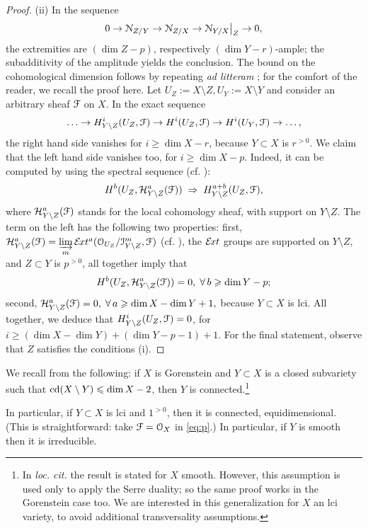\documentclass[11pt,reqno]{amsart}
\newenvironment{m-remark}{\vskip5pt\refstepcounter{stff}\trivlist \itemindent 0pt
\item[\hskip\labelsep\bf Remark~\thestff]\ignorespaces}{\endtrivlist\vskip5pt}
\let\euf\EuScript
\let\cal\mathcal
\let\nit\noindent
\numberwithin{equation}{section}
\numberwithin{figure}{section}
\let\sm\setminus
\let\ges\geqslant
\let\les\leqslant
\begin{document}
\begin{proof}
\nit(ii) In the sequence 
$$
0\to{{\euf N}}_{Z/Y}\to{{\euf N}}_{Z/X}\to{{{\euf N}}_{Y/X}\big|}_{Z}\to 0,
$$ 
the extremities are $(\dim Z-p)$, respectively $(\dim Y-r)$-ample; 
the subadditivity of the amplitude \cite[Theorem 3.1]{ar} yields the conclusion. 
The bound on the cohomological dimension follows by repeating \emph{ad litteram} 
\cite[Proposition 6.4]{ot}; for the comfort of the reader, we recall the proof here. 
Let $U_Z:=X\sm Z, U_Y:=X\sm Y$ and consider an arbitrary sheaf ${{\euf F}}$ on $X$. 
In the exact sequence 
$$
\ldots\to H^i_{Y\sm Z}(U_Z,{{\euf F}})\to H^i(U_Z,{{\euf F}})\to H^i(U_Y,{{\euf F}})\to\ldots,
$$
the right hand side vanishes for $i\ges\dim X-r$, because $Y\subset X$ is $r^{{>0}}$. 
We claim that the left hand side vanishes too, for $i\ges \dim X-p$. 
Indeed, it can be computed by using the spectral sequence 
(cf. \cite[Expos\'e I, Th\'eor\`eme 2.6]{groth}): 
$$
H^b(U_Z,\cal H^a_{Y\sm Z}({{\euf F}}))\;\Rightarrow\;H^{a+b}_{Y\sm Z}(U_Z,{{\euf F}}),
$$
where $\cal H^a_{Y\sm Z}({{\euf F}})$ stands for the local cohomology sheaf, with 
support on $Y\sm Z$. The term on the left has the following two properties: 
first, $\cal H^a_{Y\sm Z}({{\euf F}})=\underset{m}{\varinjlim}\,
{{\cal E}}{\kern-1pt}xt^a({{\euf O}}_{U_Z}/{{\euf I}}_{Y\sm Z}^m,{{\euf F}})$ 
(cf. \cite[Expos\'e II, Th\'eor\`eme 2]{groth}), the ${{\cal E}}{\kern-1pt}xt$ groups 
are supported on $Y\sm Z$, and $Z\subset Y$ is $p^{{>0}}$, all together imply that 
$$
H^b(U_Z,\cal H^a_{Y\sm Z}({{\euf F}}))=0,\;\forall\,b\ges\dim Y-p;
$$
second, $\cal H^a_{Y\sm Z}({{\euf F}})=0,\;\forall\,a\ges\dim X-\dim Y+1,$ because 
$Y\subset X$ is lci. All together, we deduce that 
$H^i_{Y\sm Z}(U_Z,{{\euf F}})=0$, for $i\ges(\dim X-\dim Y)+(\dim Y-p-1)+1$. 
For the final statement, observe that $Z$ satisfies the conditions (i). 
\end{proof}

\begin{m-remark}\label{rmk:conn} 
We recall from \cite[Ch. III, Corollary 3.9]{hart-as} the following: 
if $X$ is Gorenstein and $Y\subset X$ is a closed subvariety such that 
${{\rm cd}}(X\sm Y)\les\dim X-2$, then $Y$ is connected.\footnote{In \textit{loc. cit.} 
the result is stated for $X$ smooth. However, this assumption is used only 
to apply the Serre duality; so the same proof works in the Gorenstein case too. 
We are interested in this generalization for $X$ an lci variety, to avoid 
additional transversality assumptions.} 

In particular, if $Y\subset X$ is lci and $1^{{>0}}$, then it is connected, 
equidimensional. (This is straightforward: take ${{\euf F}}={{\euf O}}_X$ in \eqref{eq:p}.) 
In particular, if $Y$ is smooth then it is irreducible. 
\end{m-remark}
\end{document}
